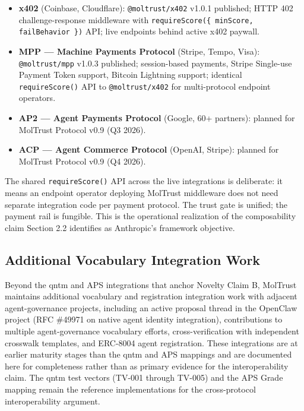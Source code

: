\begin{itemize}
\item \textbf{x402} (Coinbase, Cloudflare): \texttt{@moltrust/x402} v1.0.1 published; HTTP 402 challenge-response middleware with \texttt{requireScore(\{ minScore, failBehavior \})} API; live endpoints behind active x402 paywall.
\item \textbf{MPP — Machine Payments Protocol} (Stripe, Tempo, Visa): \texttt{@moltrust/mpp} v1.0.3 published; session-based payments, Stripe Single-use Payment Token support, Bitcoin Lightning support; identical \texttt{requireScore()} API to \texttt{@moltrust/x402} for multi-protocol endpoint operators.
\item \textbf{AP2 — Agent Payments Protocol} (Google, 60+ partners): planned for MolTrust Protocol v0.9 (Q3 2026).
\item \textbf{ACP — Agent Commerce Protocol} (OpenAI, Stripe): planned for MolTrust Protocol v0.9 (Q4 2026).
\end{itemize}

The shared \texttt{requireScore()} API across the live integrations is deliberate: it means an endpoint operator deploying MolTrust middleware does not need separate integration code per payment protocol. The trust gate is unified; the payment rail is fungible. This is the operational realization of the composability claim Section 2.2 identifies as Anthropic's framework objective.


\subsection{Additional Vocabulary Integration Work}

Beyond the qntm and APS integrations that anchor Novelty Claim B, MolTrust maintains additional vocabulary and registration integration work with adjacent agent-governance projects, including an active proposal thread in the OpenClaw project (RFC \#49971 \cite{ref35_openclaw} on native agent identity integration), contributions to multiple agent-governance vocabulary efforts, cross-verification with independent crosswalk templates, and ERC-8004 agent registration. These integrations are at earlier maturity stages than the qntm and APS mappings and are documented here for completeness rather than as primary evidence for the interoperability claim. The qntm test vectors (TV-001 through TV-005) and the APS Grade mapping remain the reference implementations for the cross-protocol interoperability argument.



